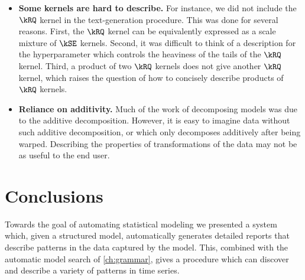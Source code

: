 \begin{itemize}

\item {\bf Some kernels are hard to describe.}
For instance, we did not include the $\kRQ$ kernel in the text-generation procedure.
This was done for several reasons.
First, the $\kRQ$ kernel can be equivalently expressed as a scale mixture of $\kSE$ kernels.
Second, it was difficult to think of a description for the hyperparameter which controls the heaviness of the tails of the $\kRQ$ kernel.
Third, a product of two $\kRQ$ kernels does not give another $\kRQ$ kernel, which raises the question of how to concisely describe products of $\kRQ$ kernels.

\item {\bf Reliance on additivity.}
Much of the work of decomposing models was due to the additive decomposition.
However, it is easy to imagine data without such additive decomposition, or which only decomposes additively after being warped.
Describing the properties of transformations of the data may not be as useful to the end user.

\end{itemize}


\section{Conclusions}
Towards the goal of automating statistical modeling we presented a system which, given a structured \gp{} model, automatically generates detailed reports that describe patterns in the data captured by the model.
This, combined with the automatic model search of \cref{ch:grammar}, gives a procedure which can discover and describe a variety of patterns in time series.




